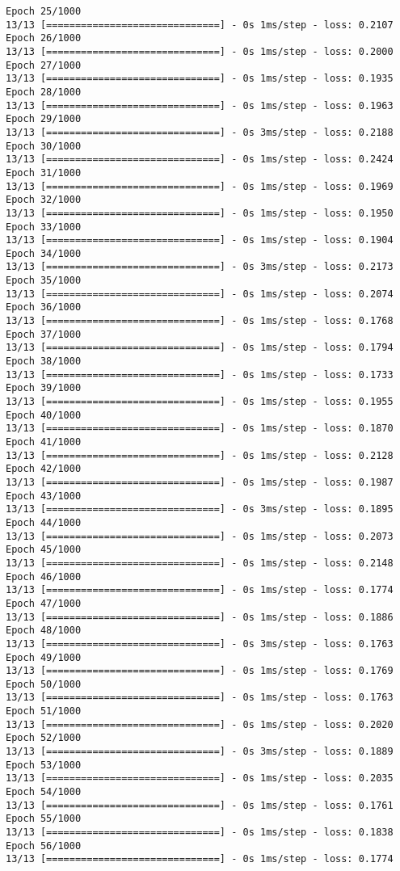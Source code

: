 \documentclass[11pt]{article}
\begin{document}
\begin{Verbatim}[commandchars=\\\{\}]
Epoch 25/1000
13/13 [==============================] - 0s 1ms/step - loss: 0.2107
Epoch 26/1000
13/13 [==============================] - 0s 1ms/step - loss: 0.2000
Epoch 27/1000
13/13 [==============================] - 0s 1ms/step - loss: 0.1935
Epoch 28/1000
13/13 [==============================] - 0s 1ms/step - loss: 0.1963
Epoch 29/1000
13/13 [==============================] - 0s 3ms/step - loss: 0.2188
Epoch 30/1000
13/13 [==============================] - 0s 1ms/step - loss: 0.2424
Epoch 31/1000
13/13 [==============================] - 0s 1ms/step - loss: 0.1969
Epoch 32/1000
13/13 [==============================] - 0s 1ms/step - loss: 0.1950
Epoch 33/1000
13/13 [==============================] - 0s 1ms/step - loss: 0.1904
Epoch 34/1000
13/13 [==============================] - 0s 3ms/step - loss: 0.2173
Epoch 35/1000
13/13 [==============================] - 0s 1ms/step - loss: 0.2074
Epoch 36/1000
13/13 [==============================] - 0s 1ms/step - loss: 0.1768
Epoch 37/1000
13/13 [==============================] - 0s 1ms/step - loss: 0.1794
Epoch 38/1000
13/13 [==============================] - 0s 1ms/step - loss: 0.1733
Epoch 39/1000
13/13 [==============================] - 0s 1ms/step - loss: 0.1955
Epoch 40/1000
13/13 [==============================] - 0s 1ms/step - loss: 0.1870
Epoch 41/1000
13/13 [==============================] - 0s 1ms/step - loss: 0.2128
Epoch 42/1000
13/13 [==============================] - 0s 1ms/step - loss: 0.1987
Epoch 43/1000
13/13 [==============================] - 0s 3ms/step - loss: 0.1895
Epoch 44/1000
13/13 [==============================] - 0s 1ms/step - loss: 0.2073
Epoch 45/1000
13/13 [==============================] - 0s 1ms/step - loss: 0.2148
Epoch 46/1000
13/13 [==============================] - 0s 1ms/step - loss: 0.1774
Epoch 47/1000
13/13 [==============================] - 0s 1ms/step - loss: 0.1886
Epoch 48/1000
13/13 [==============================] - 0s 3ms/step - loss: 0.1763
Epoch 49/1000
13/13 [==============================] - 0s 1ms/step - loss: 0.1769
Epoch 50/1000
13/13 [==============================] - 0s 1ms/step - loss: 0.1763
Epoch 51/1000
13/13 [==============================] - 0s 1ms/step - loss: 0.2020
Epoch 52/1000
13/13 [==============================] - 0s 3ms/step - loss: 0.1889
Epoch 53/1000
13/13 [==============================] - 0s 1ms/step - loss: 0.2035
Epoch 54/1000
13/13 [==============================] - 0s 1ms/step - loss: 0.1761
Epoch 55/1000
13/13 [==============================] - 0s 1ms/step - loss: 0.1838
Epoch 56/1000
13/13 [==============================] - 0s 1ms/step - loss: 0.1774

\end{Verbatim}
\end{document}
